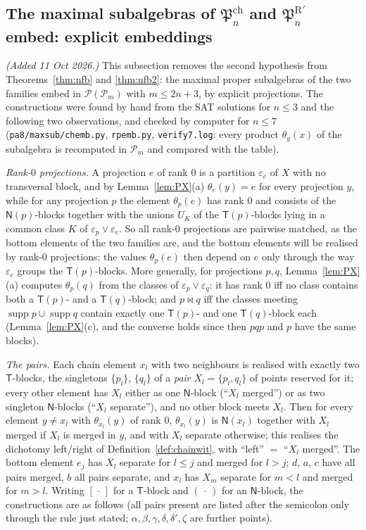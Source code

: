 \documentclass[11pt]{amsart}
\theoremstyle{definition}
\renewcommand{\P}{\mathcal{P}}
\newcommand{\supp}{\operatorname{supp}}
\newcommand{\T}{\mathsf{T}}
\newcommand{\N}{\mathsf{N}}
\newcommand{\mt}{\bowtie}   %
\begin{document}
\subsection{The maximal subalgebras of $\mathfrak P^{\mathrm{ch}}_n$ and $\mathfrak P^{\mathrm R'}_n$ embed: explicit embeddings}\label{subsec:maxsub}

\emph{(Added 11 Oct 2026.)} This subsection removes the second hypothesis from Theorems~\ref{thm:nfb} and \ref{thm:nfb2}: the maximal proper subalgebras of the two families embed in $\P(\P_m)$ with $m\le2n+3$, by explicit projections. The constructions were found by hand from the SAT solutions for $n\le3$ and the following two observations, and checked by computer for $n\le7$ (\texttt{pa8/maxsub/chemb.py}, \texttt{rpemb.py}, \texttt{verify7.log}: every product $\theta_y(x)$ of the subalgebra is recomputed in $\P_m$ and compared with the table).

\emph{Rank-$0$ projections.} A projection $e$ of rank $0$ is a partition $\varepsilon_e$ of $X$ with no transversal block, and by Lemma~\ref{lem:PX}(a) $\theta_e(y)=e$ for every projection $y$, while for any projection $p$ the element $\theta_p(e)$ has rank $0$ and consists of the $\N(p)$-blocks together with the unions $U_K$ of the $\T(p)$-blocks lying in a common class $K$ of $\varepsilon_p\vee\varepsilon_e$. So all rank-$0$ projections are pairwise matched, as the bottom elements of the two families are, and the bottom elements will be realised by rank-$0$ projections; the values $\theta_p(e)$ then depend on $e$ only through the way $\varepsilon_e$ groups the $\T(p)$-blocks. More generally, for projections $p,q$, Lemma~\ref{lem:PX}(a) computes $\theta_p(q)$ from the classes of $\varepsilon_p\vee\varepsilon_q$: it has rank $0$ iff no class contains both a $\T(p)$- and a $\T(q)$-block; and $p\mt q$ iff the classes meeting $\supp p\cup\supp q$ contain exactly one $\T(p)$- and one $\T(q)$-block each (Lemma~\ref{lem:PX}(c), and the converse holds since then $pqp$ and $p$ have the same blocks).

\emph{The pairs.} Each chain element $x_l$ with two neighbours is realised with exactly two $\T$-blocks, the singletons $\{p_l\}$, $\{q_l\}$ of a \emph{pair} $X_l=\{p_l,q_l\}$ of points reserved for it; every other element has $X_l$ either as one $\N$-block (``$X_l$ merged'') or as two singleton $\N$-blocks (``$X_l$ separate''), and no other block meets $X_l$. Then for every element $y\ne x_l$ with $\theta_{x_l}(y)$ of rank $0$, $\theta_{x_l}(y)$ is $\N(x_l)$ together with $X_l$ merged if $X_l$ is merged in $y$, and with $X_l$ separate otherwise; this realises the dichotomy left/right of Definition~\ref{def:chainwit}, with ``left'' $=$ ``$X_l$ merged''. The bottom element $e_j$ has $X_l$ separate for $l\le j$ and merged for $l>j$; $d$, $a$, $c$ have all pairs merged, $b$ all pairs separate, and $x_l$ has $X_m$ separate for $m<l$ and merged for $m>l$. Writing $[\,\cdot\,]$ for a $\T$-block and $(\,\cdot\,)$ for an $\N$-block, the constructions are as follows (all pairs present are listed after the semicolon only through the rule just stated; $\alpha,\beta,\gamma,\delta,\delta',\zeta$ are further points).
\end{document}

